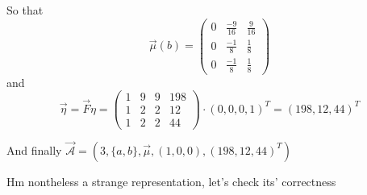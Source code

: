         
        
        So that \[ \overrightarrow{\mu}(b) = 
            \begin{pmatrix}
                0 & \frac{-9}{16} & \frac{9}{16} \\
                0 & \frac{-1}{8} & \frac{1}{8} \\
                0 & \frac{-1}{8} & \frac{1}{8} 
            \end{pmatrix} \]
        and 
        \[ \overrightarrow{\eta} = \overrightarrow{F} \eta =  \begin{pmatrix}
                1 & 9 & 9 & 198 \\
                1 & 2 & 2 & 12  \\
                1 & 2 & 2 & 44
            \end{pmatrix} \cdot (0,0,0,1)^T = (198, 12, 44)^T \]
            
            
        And finally $\overrightarrow{\mathcal{A}} = (3, \{a, b\}, \overrightarrow{\mu}, (1,0,0), (198, 12, 44)^T)$
        
        \vspace{1cm}
        Hm nontheless a strange representation, let's check its' correctness
        \newpage
        
        
        
        
        
